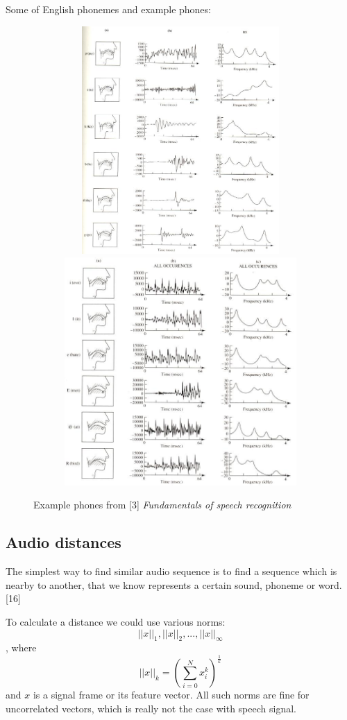 \documentclass[12pt,a4paper,english]{article}
\begin{document}
Some of English phonemes and example phones:
\begin{figure}[hb]
    \centering
    \includegraphics[height=8.7cm, width=13cm]{example_phones_1.jpg}
    \includegraphics[height=8.7cm, width=13cm]{example_phones_2.jpg}
    \caption[]{Example phones from [3] \emph{Fundamentals of speech recognition}}
\end{figure}

\newpage
\subsection{Audio distances}

The simplest way to find similar audio sequence is to find a sequence which is nearby to another,
that we know represents a certain sound, phoneme or word. [16] \newline

To calculate a distance we could use various norms:
\begin{equation}
    ||x||_1 , || x ||_2, ... , || x ||_\infty
\end{equation}
, where 
\begin{equation}
    ||x||_k = (\sum_{i=0}^{N} x_i^k)^\frac{1}{k}
\end{equation}
and $x$ is a signal frame or its feature vector. \newline
All such norms are fine for uncorrelated vectors, which is really not the case with speech signal. \newline
\end{document}
